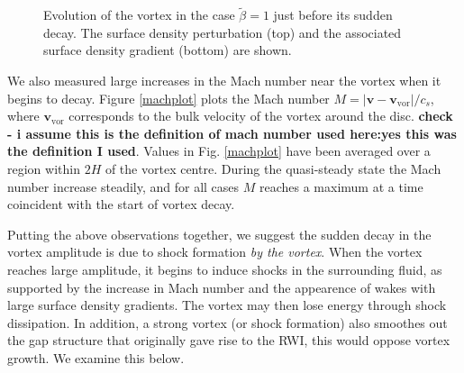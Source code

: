 \begin{figure}
{  }
\hfill
\hfill
  \caption{Evolution of the vortex in the case $\tilde{\beta}=1$
    just before its sudden decay. The surface density perturbation
    (top) and the associated surface density gradient (bottom) are shown.
    \label{shockplot}}
\end{figure}

We also measured large increases in the Mach number near
the vortex when it begins to decay. Figure \ref{machplot} plots the
Mach number $M=|\bm{v} - \bm{v}_\mathrm{vor}|/c_s$, where
$\bm{v}_\mathrm{vor}$ corresponds to the bulk velocity of the vortex
around the disc. {\bf check - i assume this is the definition of mach
  number used here:yes this was the definition I used}. Values in Fig. \ref{machplot} have been averaged over
a region within $2H$ of the vortex centre.    
During the quasi-steady state the Mach number increase
steadily, and for all cases $M$ reaches a maximum at 
a time coincident with the start of vortex decay.  

Putting the above observations together, we suggest the sudden decay
in the vortex amplitude is due to shock formation \emph{by the
  vortex}. When the vortex reaches large amplitude, it begins
to induce shocks in the surrounding fluid, as supported by the
increase in Mach number and the appearence of wakes with large surface
density gradients. The vortex may then lose energy through shock
dissipation. In addition, a strong vortex (or shock formation) 
also smoothes out the gap structure that originally gave rise to the
RWI, this would oppose vortex growth. We examine this below.

